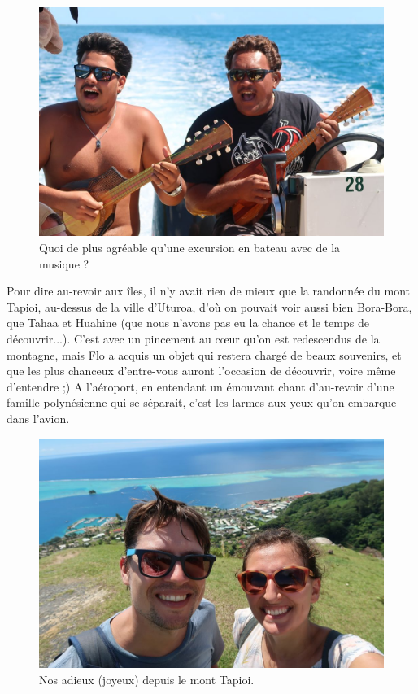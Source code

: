 \begin{figure}
\centering
\includegraphics{images/20180820_tahaa.JPG}
\caption{Quoi de plus agréable qu'une excursion en bateau avec de la
musique ?}
\end{figure}

Pour dire au-revoir aux îles, il n'y avait rien de mieux que la
randonnée du mont Tapioi, au-dessus de la ville d'Uturoa, d'où on
pouvait voir aussi bien Bora-Bora, que Tahaa et Huahine (que nous
n'avons pas eu la chance et le temps de découvrir...). C'est avec un
pincement au cœur qu'on est redescendus de la montagne, mais Flo a
acquis un objet qui restera chargé de beaux souvenirs, et que les plus
chanceux d'entre-vous auront l'occasion de découvrir, voire même
d'entendre ;) A l'aéroport, en entendant un émouvant chant d'au-revoir
d'une famille polynésienne qui se séparait, c'est les larmes aux yeux
qu'on embarque dans l'avion.

\begin{figure}
\centering
\includegraphics{images/20180820_raiatea.JPG}
\caption{Nos adieux (joyeux) depuis le mont Tapioi.}
\end{figure}

